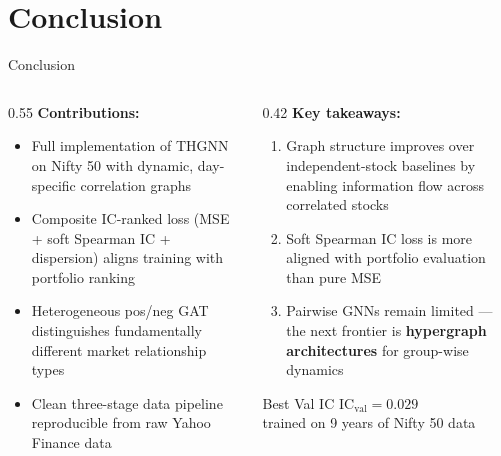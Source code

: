 \documentclass[aspectratio=169, 10pt]{beamer}
\begin{document}
\section{Conclusion}

\begin{frame}{Conclusion}
  \begin{columns}[T]
    \begin{column}{0.55\textwidth}
      \textbf{Contributions:}
      \begin{itemize}\setlength{\itemsep}{3pt}
        \item Full implementation of THGNN on Nifty 50 with dynamic,
              day-specific correlation graphs
        \item Composite IC-ranked loss (MSE + soft Spearman IC +
              dispersion) aligns training with portfolio ranking
        \item Heterogeneous pos/neg GAT distinguishes fundamentally
              different market relationship types
        \item Clean three-stage data pipeline reproducible from raw
              Yahoo Finance data
      \end{itemize}
    \end{column}
    \begin{column}{0.42\textwidth}
      \textbf{Key takeaways:}
      \begin{enumerate}\setlength{\itemsep}{3pt}
        \item Graph structure improves over independent-stock baselines
              by enabling information flow across correlated stocks
        \item Soft Spearman IC loss is more aligned with portfolio
              evaluation than pure MSE
        \item Pairwise GNNs remain limited — the next frontier is
              \textbf{hypergraph architectures} for group-wise dynamics
      \end{enumerate}

      \medskip
      \begin{block}{Best Val IC}
        \centering
        $\text{IC}_\text{val} = 0.029$\\
        {\small trained on 9 years of Nifty 50 data}
      \end{block}
    \end{column}
  \end{columns}
\end{frame}
\end{document}
